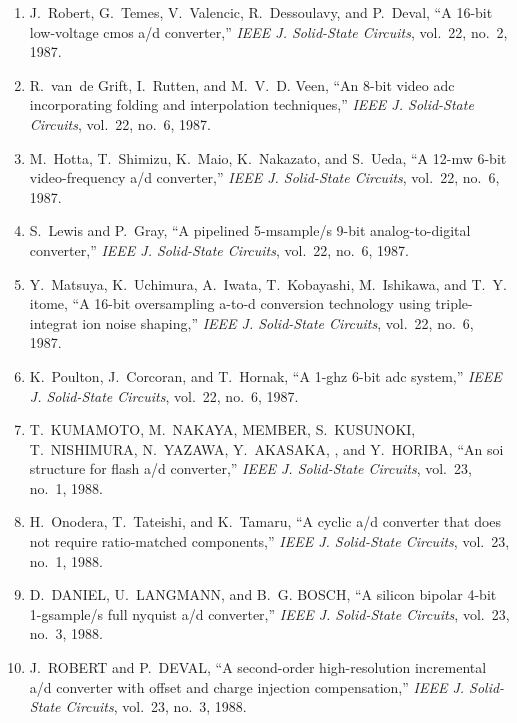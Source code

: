 \begin{enumerate}
\item
J.~Robert, G.~Temes, V.~Valencic, R.~Dessoulavy, and P.~Deval, ``A 16-bit
  low-voltage cmos a/d converter,'' \emph{{IEEE} J. Solid-State Circuits},
  vol.~22, no.~2, 1987.

\item
R.~van~de Grift, I.~Rutten, and M.~V.~D. Veen, ``An 8-bit video adc
  incorporating folding and interpolation techniques,'' \emph{{IEEE} J.
  Solid-State Circuits}, vol.~22, no.~6, 1987.

\item
M.~Hotta, T.~Shimizu, K.~Maio, K.~Nakazato, and S.~Ueda, ``A 12-mw 6-bit
  video-frequency a/d converter,'' \emph{{IEEE} J. Solid-State Circuits},
  vol.~22, no.~6, 1987.

\item
S.~Lewis and P.~Gray, ``A pipelined 5-msample/s 9-bit analog-to-digital
  converter,'' \emph{{IEEE} J. Solid-State Circuits}, vol.~22, no.~6, 1987.

\item
Y.~Matsuya, K.~Uchimura, A.~Iwata, T.~Kobayashi, M.~Ishikawa, and T.~Y. itome,
  ``A 16-bit oversampling a-to-d conversion technology using triple-integrat
  ion noise shaping,'' \emph{{IEEE} J. Solid-State Circuits}, vol.~22, no.~6,
  1987.

\item
K.~Poulton, J.~Corcoran, and T.~Hornak, ``A 1-ghz 6-bit adc system,''
  \emph{{IEEE} J. Solid-State Circuits}, vol.~22, no.~6, 1987.

\item
T.~KUMAMOTO, M.~NAKAYA, MEMBER, S.~KUSUNOKI, T.~NISHIMURA, N.~YAZAWA,
  Y.~AKASAKA, , and Y.~HORIBA, ``An soi structure for flash a/d converter,''
  \emph{{IEEE} J. Solid-State Circuits}, vol.~23, no.~1, 1988.

\item
H.~Onodera, T.~Tateishi, and K.~Tamaru, ``A cyclic a/d converter that does not
  require ratio-matched components,'' \emph{{IEEE} J. Solid-State Circuits},
  vol.~23, no.~1, 1988.

\item
D.~DANIEL, U.~LANGMANN, and B.~G. BOSCH, ``A silicon bipolar 4-bit 1-gsample/s
  full nyquist a/d converter,'' \emph{{IEEE} J. Solid-State Circuits}, vol.~23,
  no.~3, 1988.

\item
J.~ROBERT and P.~DEVAL, ``A second-order high-resolution incremental a/d
  converter with offset and charge injection compensation,'' \emph{{IEEE} J.
  Solid-State Circuits}, vol.~23, no.~3, 1988.


\end{enumerate}
